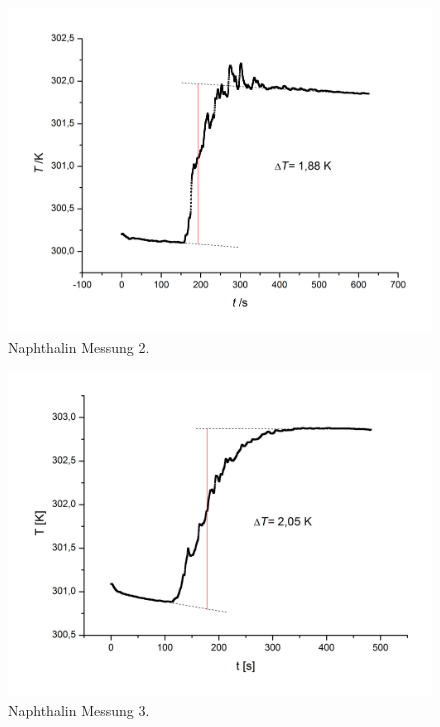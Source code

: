 \documentclass[12pt,a4paper,titlepage,headinclude,bibtotoc]{scrartcl}
\begin{document}
\begin{figure} [h!]
\begin{center}
\includegraphics[scale=0.45]{Napht2.png} \end{center}
\caption{Naphthalin Messung 2.}
\end{figure}

\begin{figure} [h!]
\begin{center}
\includegraphics[scale=0.45]{Napht3.png} \end{center}
\caption{Naphthalin Messung 3.}
\end{figure}
\FloatBarrier
\end{document}
